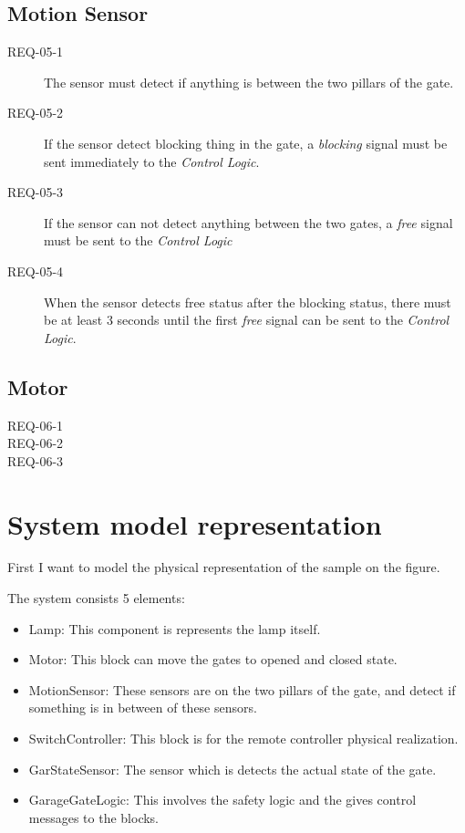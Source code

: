 \subsection{Motion Sensor}
\begin{description}
	\item [REQ-05-1] The sensor must detect if anything is between the two pillars of the gate. 
	\item [REQ-05-2] If the sensor detect blocking thing in the gate, a \textit{blocking} signal must be sent immediately to the \textit{Control Logic}.
	\item [REQ-05-3] If the sensor can not detect anything between the two gates, a \textit{free} signal must be sent to the \textit{Control Logic}
	\item [REQ-05-4] When the sensor detects free status after the blocking status, there must be at least 3 seconds until the first \textit{free} signal can be sent to the \textit{Control Logic}.
\end{description}

\subsection{Motor}
\begin{description}
	\item [REQ-06-1] 
	\item [REQ-06-2] 
	\item [REQ-06-3] 
\end{description}


\section{System model representation}

First I want to model the physical representation of the sample on the  figure.

The system consists 5 elements:
\begin{itemize}
	\item Lamp: This component is represents the lamp itself.
	\item Motor: This block can move the gates to opened and closed state.
	\item MotionSensor: These sensors are on the two pillars of the gate, and detect if something is in between of these sensors.
	\item SwitchController: This block is for the remote controller physical realization.
	\item GarStateSensor: The sensor which is detects the actual state of the gate.
    \item GarageGateLogic: This involves the safety logic and the gives control messages to the blocks.
\end{itemize}

